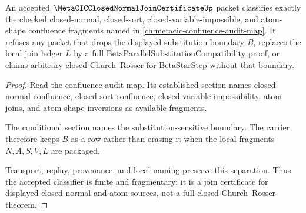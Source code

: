 \begin{theorem}
\label{thm:metacic-closed-normal-join-certificate-classifier}
An accepted $\MetaCICClosedNormalJoinCertificateUp$ packet classifies exactly the checked closed-normal, closed-sort, closed-variable-impossible, and atom-shape confluence fragments named in \autoref{ch:metacic-confluence-audit-map}. It refuses any packet that drops the displayed substitution boundary $B$, replaces the local join ledger $L$ by a full $\mathrm{BetaParallelSubstitutionCompatibility}$ proof, or claims arbitrary closed Church--Rosser for $\mathrm{BetaStarStep}$ without that boundary.
\end{theorem}
\begin{proof}
Read the confluence audit map. Its established section names closed normal confluence, closed sort confluence, closed variable impossibility, atom joins, and atom-shape inversions as available fragments.

The conditional section names the substitution-sensitive boundary. The carrier therefore keeps $B$ as a row rather than erasing it when the local fragments $N,A,S,V,L$ are packaged.

Transport, replay, provenance, and local naming preserve this separation. Thus the accepted classifier is finite and fragmentary: it is a join certificate for displayed closed-normal and atom sources, not a full closed Church--Rosser theorem.
\end{proof}

